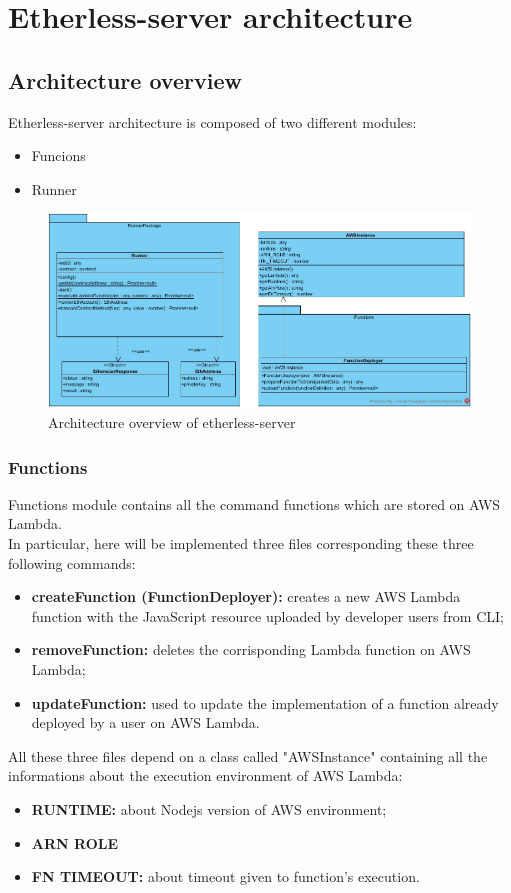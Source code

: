 \section{Etherless-server architecture}
\subsection{Architecture overview}
Etherless-server architecture is composed of two different modules:
\begin{itemize}
	\item Funcions
	\item Runner
\end{itemize}
\begin{figure}[!h]
\centering
	\includegraphics[width=\textwidth]{res/img/etherlessServer.jpg}
	\caption{Architecture overview of etherless-server}
\end{figure}
\subsubsection{Functions}
Functions module contains all the command functions which are stored on AWS Lambda. \\
In particular, here will be implemented three files corresponding these three following commands:
\begin{itemize}
	\item \textbf{createFunction (FunctionDeployer):} creates a new AWS Lambda function with the JavaScript resource uploaded by developer users from CLI\glo;
	\item \textbf{removeFunction:} deletes the corrisponding Lambda function on AWS Lambda;
	\item \textbf{updateFunction:} used to update the implementation of a function already deployed by a user on AWS Lambda.
\end{itemize}
All these three files depend on a class called "AWSInstance" containing all the informations about the execution environment of AWS Lambda:
\begin{itemize}
	\item \textbf{RUNTIME:} about Nodejs version of AWS environment;
	\item \textbf{ARN ROLE}
	\item \textbf{FN TIMEOUT:} about timeout given to function's execution.
\end{itemize}


